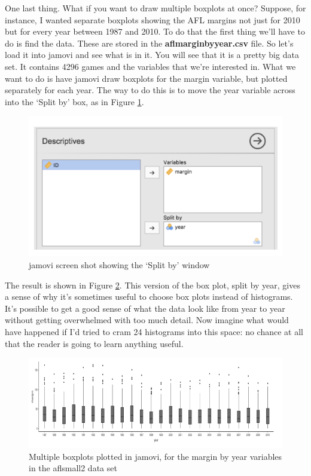 \documentclass[
]{book}
\begin{document}
One last thing. What if you want to draw multiple boxplots at once? Suppose, for instance, I wanted separate boxplots showing the AFL margins not just for 2010 but for every year between 1987 and 2010. To do that the first thing we'll have to do is find the data. These are stored in the \textbf{aflmarginbyyear.csv} file. So let's load it into jamovi and see what is in it. You will see that it is a pretty big data set. It contains 4296 games and the variables that we're interested in. What we want to do is have jamovi draw boxplots for the margin variable, but plotted separately for each year. The way to do this is to move the year variable across into the `Split by' box, as in Figure \ref{fig:fig5-6}.

\begin{figure}
\includegraphics[width=0.9\linewidth]{images/Figure27} \caption{jamovi screen shot showing the ‘Split by’ window}\label{fig:fig5-6}
\end{figure}

The result is shown in Figure \ref{fig:fig5-7}. This version of the box plot, split by year, gives a sense of why it's sometimes useful to choose box plots instead of histograms. It's possible to get a good sense of what the data look like from year to year without getting overwhelmed with too much detail. Now imagine what would have happened if I'd tried to cram 24 histograms into this space: no chance at all that the reader is going to learn anything useful.

\begin{figure}
\includegraphics[width=0.9\linewidth]{images/Figure28} \caption{Multiple boxplots plotted in jamovi, for the margin by year variables in the aflsmall2 data set}\label{fig:fig5-7}
\end{figure}
\end{document}
